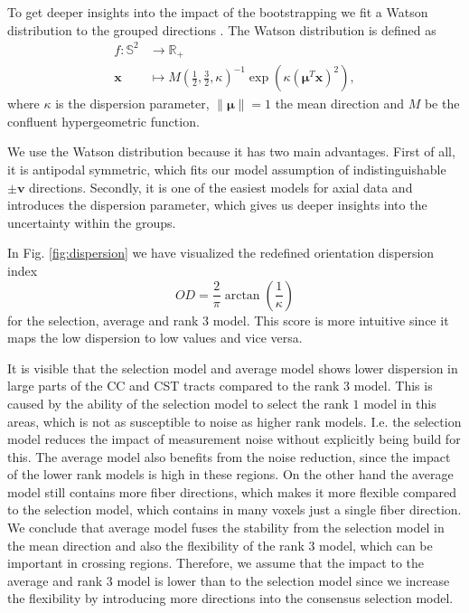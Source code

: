 To get deeper insights into the impact of the bootstrapping we fit a Watson
distribution to the grouped directions \cite{jupp_mardia_1999}. The Watson distribution is defined as  
\begin{align*}
	f : \mathbb{S}^2 & \longrightarrow  \mathbb{R}_+ \\
	\mathbf{x} & \longmapsto  M \left( \frac{1}{2}, \frac{3}{2} , \kappa
	\right)^{-1} \exp \left(  \kappa
	\left( \mathbf{\mu}^T \mathbf{x} \right)^2 
	\right) 	,  
\end{align*}
where $\kappa$ is the dispersion parameter, $\| \mathbf{\mu} \| = 1$ the
mean direction and $M$ be the confluent hypergeometric function. 

We use the Watson distribution because it has two main advantages. First of all, it is antipodal symmetric,
which fits our model assumption of indistinguishable $\pm \mathbf{v}$
directions. Secondly, it is one of the easiest models for axial data and
introduces the dispersion parameter, which gives  us deeper insights into the
uncertainty within the groups. 

In Fig. \ref{fig:dispersion} we have visualized the redefined orientation dispersion index
\cite{dispersionParameter}  
\[ OD = \frac{2}{\pi} \arctan \left( \frac{1}{\kappa} \right) \] 
for the selection, average and rank 3 model. This score is more intuitive since
it maps the low dispersion to low values and vice versa. 

It is visible that the
selection model and average model shows lower dispersion in large parts of the CC and CST tracts
compared to the rank $3$ model. This is caused by the
ability of the selection model to select the rank $1$ model in this areas, which
is not as susceptible to noise as higher rank models. I.e. the selection model
reduces the impact of measurement noise without explicitly being build for
this. The average model also benefits from the noise reduction, since the impact
of the lower rank models is high in these regions.
On the other hand the average model still contains more fiber directions, which
makes it more flexible compared to the selection model, which contains in many
voxels just a single fiber direction.
We conclude that average model fuses the stability from the selection model in
the mean direction and also the flexibility of the rank $3$ model, which can be
important in crossing regions.
Therefore, we assume that the impact to the average and rank $3$ model is lower
than to the selection model since we increase the flexibility by introducing
more directions into the consensus selection model. 



